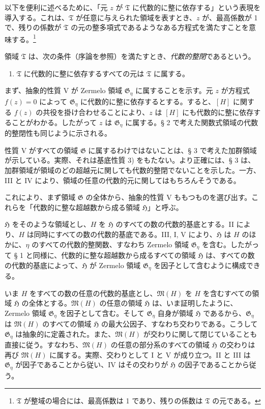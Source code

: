 \documentclass[11pt]{article}
\begin{document}
以下を便利に述べるために、「元 $z$ が $\mathfrak T$ に代数的に整に依存する」という表現を導入する。これは、$\mathfrak T$ が任意に与えられた領域を表すとき、$z$ が、最高係数が 1 で、残りの係数が $\mathfrak T$ の元の整多項式であるようなある方程式を満たすことを意味する。\footnote{$\mathfrak T$ が整域の場合には、最高係数は 1 であり、残りの係数は $\mathfrak T$ の元である。}

領域 $\mathfrak T$ は、次の条件（序論を参照）を満たすとき、\emph{代数的整閉}であるという。
\begin{enumerate}
\item[V.] $\mathfrak T$ に代数的に整に依存するすべての元は $\mathfrak T$ に属する。
\end{enumerate}

まず、抽象的性質 V が Zermelo 領域 $\mathfrak G_\eta$ に属することを示す。元 $z$ が方程式 $f(z)=0$ によって $\mathfrak G_\eta$ に代数的に整に依存するとする。すると、$[H]$ に関する $f(z)$ の共役を掛け合わせることにより、$z$ は $[H]$ にも代数的に整に依存することがわかる。したがって $z$ は $\mathfrak G_\eta$ に属する。§ 2 で考えた関数式領域の代数的整閉性も同じように示される。

性質 V がすべての領域 $\mathfrak G$ に属するわけではないことは、§ 3 で考えた加群領域が示している。実際、それは基底性質 3) をもたない。より正確には、§ 3 は、加群領域が領域のどの超越元に関しても代数的整閉でないことを示した。一方、III と IV により、領域の任意の代数的元に関してはもちろんそうである。

これにより、まず領域 $\mathfrak G$ の全体から、抽象的性質 V ももつものを選び出す。これらを「代数的に整な超越数から成る領域 $\mathfrak H$」と呼ぶ。

$\mathfrak H$ をそのような領域とし、$H$ を $\mathfrak H$ のすべての数の代数的基底とする。II により、$H$ は同時にすべての数の代数的基底である。III, I, V により、$\mathfrak H$ は $H$ のほかに、$\eta$ のすべての代数的整関数、すなわち Zermelo 領域 $\mathfrak G_\eta$ を含む。したがって § 1 と同様に、代数的に整な超越数から成るすべての領域 $\mathfrak H$ は、すべての数の代数的基底によって、$\mathfrak H$ が Zermelo 領域 $\mathfrak G_\eta$ を因子として含むように構成できる。

いま $H$ をすべての数の任意の代数的基底とし、$\mathfrak M(H)$ を $H$ を含むすべての領域 $\mathfrak H$ の全体とする。$\mathfrak M(H)$ の任意の領域 $\mathfrak H$ は、いま証明したように、Zermelo 領域 $\mathfrak G_\eta$ を因子として含む。そして $\mathfrak G_\eta$ 自身が領域 $\mathfrak H$ であるから、$\mathfrak G_\eta$ は $\mathfrak M(H)$ のすべての領域 $\mathfrak H$ の最大公因子、すなわち交わりである。こうして $\mathfrak G_\eta$ は抽象的に定義された。また、$\mathfrak M(H)$ が交わりに関して閉じていることも直接に従う。すなわち、$\mathfrak M(H)$ の任意の部分系のすべての領域 $\mathfrak H$ の交わりは再び $\mathfrak M(H)$ に属する。実際、交わりとして I と V が成り立つ。II と III は $\mathfrak G_\eta$ が因子であることから従い、IV はその交わりが $\mathfrak H$ の因子であることから従う。
\end{document}
